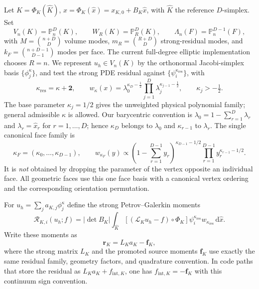 \documentclass[11pt]{article}
\newcommand{\R}{\mathcal R}
\newcommand{\Pp}{\mathbb P}
\newcommand{\dd}{\mathrm d}
\begin{document}
Let $K=\Phi_K(\widehat K)$, $x=\Phi_K(\widehat x)=x_{K,0}+B_K\widehat x$, with $\widehat K$
the reference $D$-simplex.  Set
\begin{equation}\label{eq:full_trial_spaces}
 V_n(K)=\Pp_n^D(K),\qquad
 W_R(K)=\Pp_R^D(K),\qquad
 \Lambda_n(F)=\Pp_n^{D-1}(F),
\end{equation}
with $M=\binom{n+D}{D}$ volume modes, $m_R=\binom{R+D}{D}$
strong-residual modes, and $k_F=\binom{n+D-1}{D-1}$ modes per face.
The current full-degree elliptic implementation chooses $R=n$.
We represent $u_h\in V_n(K)$ by the orthonormal Jacobi-simplex basis
$\{\phi_j^{\kappa}\}$, and test the strong PDE residual against
$\{\psi_i^{\kappa_{\mathrm{res}}}\}$, with
\begin{equation}\label{eq:full_promoted}
 \kappa_{\mathrm{res}}=\kappa+\bm 2,
 \qquad w_\kappa(x)=
 \lambda_0^{\kappa_D-\frac12}
 \prod_{j=1}^{D}\lambda_j^{\kappa_{j-1}-\frac12},
 \qquad \kappa_j>-\tfrac12.
\end{equation}
The base parameter $\kappa_j=1/2$ gives the unweighted physical
polynomial family; general admissible $\kappa$ is allowed.
Our barycentric convention is
$\lambda_0=1-\sum_{r=1}^D\lambda_r$ and $\lambda_r=\widehat x_r$
for $r=1,\ldots,D$; hence $\kappa_D$ belongs to $\lambda_0$ and
$\kappa_{r-1}$ to $\lambda_r$.  The single canonical face family is
\begin{equation}\label{eq:full_face_family}
 \kappa_F=(\kappa_0,\ldots,\kappa_{D-1}),
 \qquad
 w_{\kappa_F}(y)\propto
 (1-\textstyle\sum_{r=1}^{D-1}y_r)^{\kappa_{D-1}-1/2}
 \prod_{r=1}^{D-1}y_r^{\kappa_{r-1}-1/2}.
\end{equation}
It is \emph{not} obtained by dropping the parameter of the vertex opposite
an individual face.  All geometric faces use this one face basis with a
canonical vertex ordering and the corresponding orientation permutation.

For $u_h=\sum_j a_{K,j}\phi_j^\kappa$ define the strong Petrov--Galerkin
moments
\begin{equation}\label{eq:full_moments}
 \R_{K,i}(u_h;f)=|\det B_K|\int_{\widehat K}
  \left[(\mathcal L_Ku_h-f)\circ\Phi_K\right]
  \psi_i^{\kappa_{\mathrm{res}}}
  w_{\kappa_{\mathrm{res}}}\,\dd\widehat x.
\end{equation}
Write these moments as
\begin{equation}\label{eq:full_Lf}
 \bm r_K=L_Ka_K-\bm f_K,
\end{equation}
where the strong matrix $L_K$ and the promoted source moments
$\bm f_K$ use exactly the same residual family, geometry factors, and
quadrature convention.  In code paths that store the residual as
$L_Ka_K+f_{\mathrm{int},K}$, one has
$f_{\mathrm{int},K}=-\bm f_K$ with this continuum sign convention.
\end{document}
